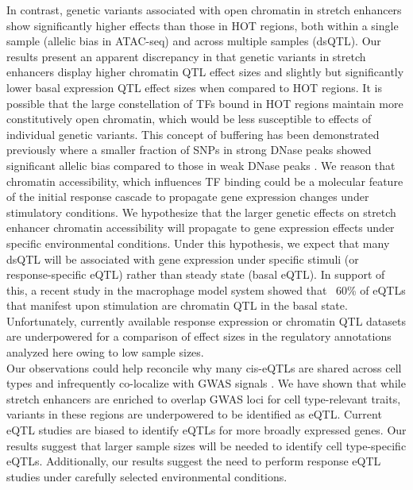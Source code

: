 In contrast, genetic variants associated with open chromatin in stretch enhancers show significantly higher effects than those in HOT regions, both within a single sample (allelic bias in ATAC-seq) and across multiple samples (dsQTL). Our results present an apparent discrepancy in that genetic variants in stretch enhancers display higher chromatin QTL effect sizes and slightly but significantly lower basal expression QTL effect sizes when compared to HOT regions. It is possible that the large constellation of TFs bound in HOT regions \cite{theencodeprojectconsortiumIntegratedEncyclopediaDNA2012, kudronModERNResourceGenomeWide2017} maintain more constitutively open chromatin, which would be less susceptible to effects of individual genetic variants. This concept of buffering has been demonstrated previously where a smaller fraction of SNPs in strong DNase peaks showed significant allelic bias compared to those in weak DNase peaks \cite{mauranoLargescaleIdentificationSequence2015}. We reason that chromatin accessibility, which influences TF binding could be a molecular feature of the initial response cascade to propagate gene expression changes under stimulatory conditions. We hypothesize that the larger genetic effects on stretch enhancer chromatin accessibility will propagate to gene expression effects under specific environmental conditions. Under this hypothesis, we expect that many dsQTL will be associated with gene expression under specific stimuli (or response-specific eQTL) rather than steady state (basal eQTL). In support of this, a recent study in the macrophage model system \cite{alasooSharedGeneticEffects2018} showed that ~60\% of eQTLs that manifest upon stimulation are chromatin QTL in the basal state. Unfortunately, currently available response expression or chromatin QTL datasets are underpowered for a comparison of effect sizes in the regulatory annotations analyzed here owing to low sample sizes. \\

Our observations could help reconcile why many cis-eQTLs are shared across cell types and infrequently co-localize with GWAS signals \cite{liuFunctionalArchitecturesLocal2017, huangFinemappingInflammatoryBowel2017, gtexconsortiumGeneticEffectsGene2017}. We have shown that while stretch enhancers are enriched to overlap GWAS loci for cell type-relevant traits, variants in these regions are underpowered to be identified as eQTL. Current eQTL studies are biased to identify eQTLs for more broadly expressed genes. Our results suggest that larger sample sizes will be needed to identify cell type-specific eQTLs. Additionally, our results suggest the need to perform response eQTL studies under carefully selected environmental conditions.



